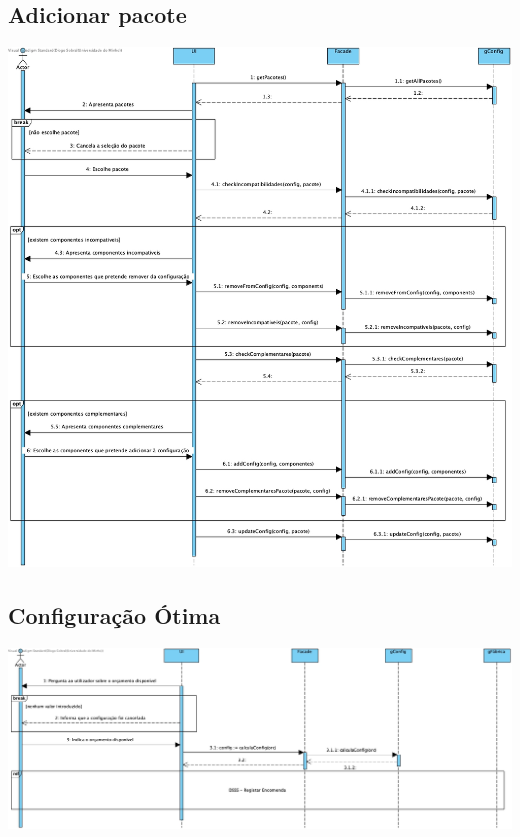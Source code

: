 \subsection{Adicionar pacote}
\begin{center}
 	\includegraphics[width = 5.5in]{DSSS/DSSS-Adicionar_Pacote.jpg}
\end{center}

\subsection{Configuração Ótima}
\begin{center}
 	\includegraphics[width = 5.5in]{DSSS/DSSS-Configuracao_otima.jpg}
\end{center}

